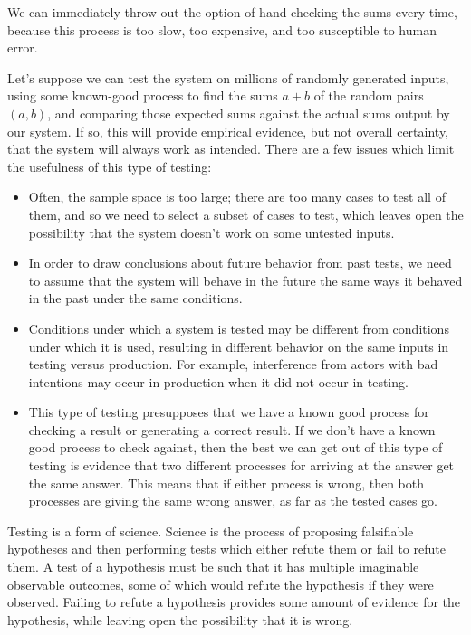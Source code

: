 \documentclass[11pt]{article}
\begin{document}
We can immediately throw out the option of hand-checking the sums every time,
because this process is too slow, too expensive, and too susceptible to human error.

Let's suppose we can test the system on millions of randomly generated inputs, using
some known-good process to find the sums $a + b$ of the random pairs $(a, b)$, and
comparing those expected sums against the actual sums output by our system. If so,
this will provide empirical evidence, but not overall certainty, that the system will always
work as intended. There are a few issues which limit the usefulness of this type of testing:

\begin{itemize}
	\item Often, the sample space is too large; there are too many cases to test all
		of them, and so we need to select a subset of cases to test, which leaves
		open the possibility that the system doesn't work on some untested inputs.
	\item In order to draw conclusions about future behavior from past tests, we need
		to assume that the system will behave in the future the same ways it behaved
		in the past under the same conditions.
	\item Conditions under which a system is tested may be different from conditions
		under which it is used, resulting in different behavior on the same inputs
		in testing versus production. For example, interference from actors with
		bad intentions may occur in production when it did not occur in testing.
	\item This type of testing presupposes that we have a known good process for checking
		a result or generating a correct result. If we don't have a known good process
		to check against, then the best we can get out of this type of testing is
		evidence that two different processes for arriving at the answer get the
		same answer. This means that if either process is wrong, then both processes
		are giving the same wrong answer, as far as the tested cases go.
\end{itemize}

Testing is a form of science. Science is the process of proposing falsifiable hypotheses and
then performing tests which either refute them or fail to refute them.
A test of a hypothesis must be such that it has multiple imaginable observable outcomes,
some of which would refute the hypothesis if they were observed.
Failing to refute a hypothesis provides some amount of evidence for the hypothesis, 
while leaving open the possibility that it is wrong.
\end{document}
